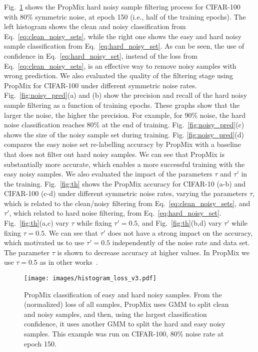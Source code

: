 \documentclass{bmvc2k}
\begin{document}
 Fig.~\ref{fig:propmix_hist} shows the PropMix hard noisy sample filtering process for CIFAR-100 with 80\% symmetric noise, at epoch 150 (i.e., half of the training epochs). 
 The left histogram shows the clean and noisy classification from Eq.~\ref{eq:clean_noisy_sets}, while the right one shows the easy and hard noisy sample classification from Eq.~\eqref{eq:hard_noisy_set}.
As can be seen, the use of confidence in Eq.~\eqref{eq:hard_noisy_set}, instead of the loss from Eq.~\ref{eq:clean_noisy_sets}, is an effective way to remove noisy samples with wrong prediction. 
We also evaluated the quality of the filtering stage using PropMix for CIFAR-100 under different symmetric noise rates. Fig.~\ref{fig:noisy_pred}(a) and (b) show the precision and recall of the hard noisy sample filtering as a function of training epochs.  These graphs show that the larger the noise, the higher the precision. 
For example, for 90\% noise, the hard noise classification reaches 80\% at the end of training. 
Fig.~\ref{fig:noisy_pred}(c) shows the size of the  noisy sample set during training. 
Fig. \ref{fig:noisy_pred}(d) compares the easy noise set re-labelling accuracy by PropMix with a baseline that does not filter out hard noisy samples. 
We can see that PropMix is substantially more accurate,
which enables a more successful training with the easy noisy samples. We also evaluated the impact of the parameters $\tau$ and $\tau'$ in the training. Fig.~\ref{fig:th} shows the PropMix accuracy for CIFAR-10 (a-b) and CIFAR-100 (c-d) under different symmetric noise rates, varying the parameters $\tau$, which is related to the clean/noisy filtering from Eq.~\ref{eq:clean_noisy_sets}, and $\tau'$, which related to hard noise filtering, from Eq.~\ref{eq:hard_noisy_set}. Fig.~\ref{fig:th}(a,c) vary $\tau$ while fixing $\tau'=0.5$, and Fig.~\ref{fig:th}(b,d) vary $\tau'$ while fixing $\tau=0.5$. We can see that $\tau'$ does not have a strong impact on the accuracy, which motivated us to use $\tau'=0.5$ independently of the noise rate and data set. The parameter $\tau$ is shown to decrease accuracy at higher values. In PropMix we use $\tau=0.5$ as in other works~\cite{DivideMix}. 

\begin{figure}[!ht]
\centering
\texttt{[image: images/histogram\_loss\_v3.pdf]}
\caption{PropMix classification of easy and hard noisy samples. From the (normalized) loss of all samples, PropMix uses GMM to split clean and noisy samples, and then, using the largest classification confidence, it uses another GMM to split the hard and easy noisy samples. This example was run on CIFAR-100, 80\% noise rate at epoch 150.  }
\label{fig:propmix_hist}
\end{figure}
\end{document}
